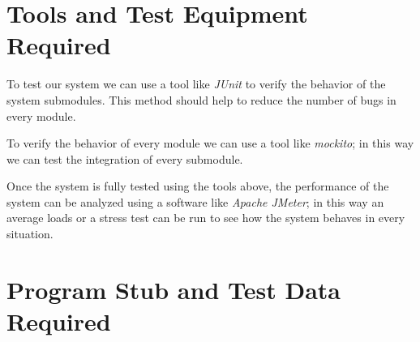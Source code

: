\section{Tools and Test Equipment Required}
	To test our system we can use a tool like \textit{JUnit} to verify the behavior of the system submodules. This method should help to reduce the number of bugs in every module.
	
	To verify the behavior of every module we can use a tool like \textit{mockito}; in this way we can test the integration of every submodule.
	
	Once the system is fully tested using the tools above, the performance of the system can be analyzed using a software like \textit{Apache JMeter}; in this way an average loads or a stress test can be run to see how the system behaves in every situation.
\section{Program Stub and Test Data Required}